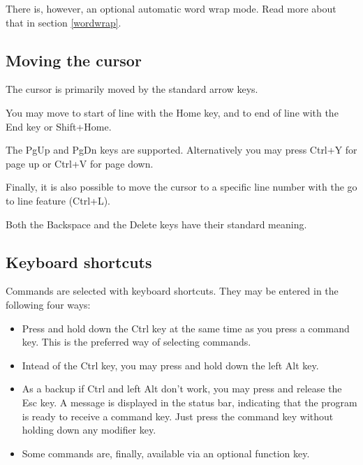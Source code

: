 \documentclass{article}
\begin{document}
        There is, however, an optional automatic 
        word wrap mode. Read more about that in section \ref{wordwrap}.
       
    \subsection{Moving the cursor}

        The cursor is primarily moved by the standard arrow keys.

        You may move to start of line with the Home key, and to end of line with the End key or Shift+Home.

        The PgUp and PgDn keys are supported. Alternatively you may press
        Ctrl+Y for page up or Ctrl+V for page down.

        Finally, it is also possible to move the cursor to a specific line number 
        with the go to line feature (Ctrl+L).

        Both the Backspace and the Delete keys have their standard meaning.

    \subsection{Keyboard shortcuts}
    \label{commands}
    
        Commands are selected with keyboard shortcuts. They may be entered in the following four ways:

        \begin{itemize}

            \item Press and hold down the Ctrl key at the same time as you press a command key. This is the
            preferred way of selecting commands.

            \item Intead of the Ctrl key, you may press and hold down the left Alt key.
            
            \item As a backup if Ctrl and left Alt don't work, you may press and release the Esc key. A message is displayed in the status bar,
            indicating that the program is ready to receive a command key. Just press the command key without holding down any modifier key.
            
            \item Some commands are, finally, available via an optional function key.
        \end{itemize}
\end{document}
